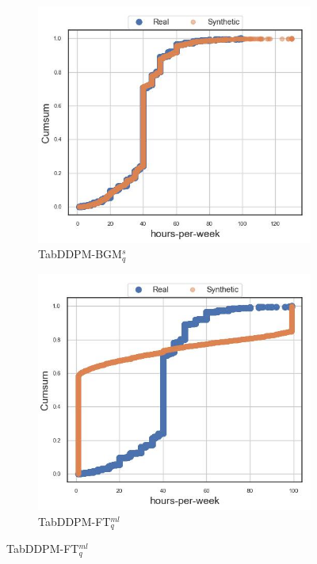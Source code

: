\begin{figure}[H]
	\begin{subfigure}{0.32\textwidth}
		\centering
		\includegraphics[width=\textwidth]{images/cdf_hpw/tab-ddpm-bgm-simTune.jpg}
		\caption{TabDDPM-BGM$^{s}_q$}
	\end{subfigure}
	\begin{subfigure}{0.32\textwidth}
		\centering
		\includegraphics[width=\textwidth]{images/cdf_hpw/tab-ddpm-ft.jpg}
		\caption{TabDDPM-FT$^{ml}_q$}
	\end{subfigure}

\end{figure}
